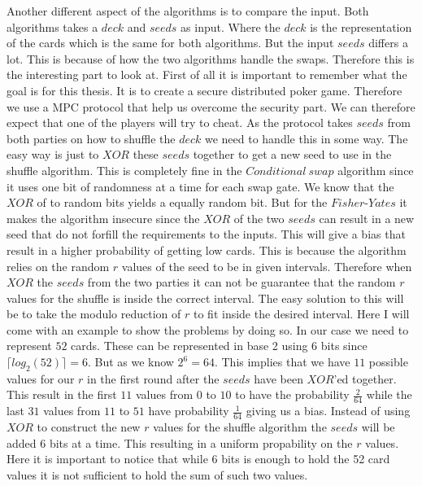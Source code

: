 Another different aspect of the algorithms is to compare the input. Both algorithms takes a $deck$ and $seeds$ as input. Where the $deck$ is the representation of the cards which is the same for both algorithms. But the input $seeds$ differs a lot. This is because of how the two algorithms handle the swaps. Therefore this is the interesting part to look at. First of all it is important to remember what the goal is for this thesis. It is to create a secure distributed poker game. Therefore we use a MPC protocol that help us overcome the security part. We can therefore expect that one of the players will try to cheat. As the protocol takes $seeds$ from both parties on how to shuffle the $deck$ we need to handle this in some way. The easy way is just to $XOR$ these $seeds$ together to get a new seed to use in the shuffle algorithm. This is completely fine in the $Conditional~swap$ algorithm since it uses one bit of randomness at a time for each swap gate. We know that the $XOR$ of to random bits yields a equally random bit. But for the $Fisher\text{-}Yates$ it makes the algorithm insecure since the $XOR$ of the two $seeds$ can result in a new seed that do not forfill the requirements to the inputs. This will give a bias that result in a higher probability of getting low cards. This is because the algorithm relies on the random $r$ values of the seed to be in given intervals. Therefore when $XOR$ the $seeds$ from the two parties it can not be guarantee that the random $r$ values for the shuffle is inside the correct interval. The easy solution to this will be to take the modulo reduction of $r$ to fit inside the desired interval. Here I will come with an example to show the problems by doing so. In our case we need to represent $52$ cards. These can be represented in base 2 using 6 bits since $\lceil{log_2(52)}\rceil=6$. But as we know $2^6=64$. This implies that we have $11$ possible values for our $r$ in the first round after the $seeds$ have been $XOR$'ed together. This result in the first $11$ values from $0$ to $10$ to have the probability $\frac{2}{64}$ while the last $31$ values from $11$ to $51$ have probability $\frac{1}{64}$ giving us a bias. 
Instead of using $XOR$ to construct the new $r$ values for the shuffle algorithm the $seeds$ will be added $6$ bits at a time. This resulting in a uniform propability on the $r$ values. Here it is important to notice that while $6$ bits is enough to hold the 52 card values it is not sufficient to hold the sum of such two values.

\bigskip

